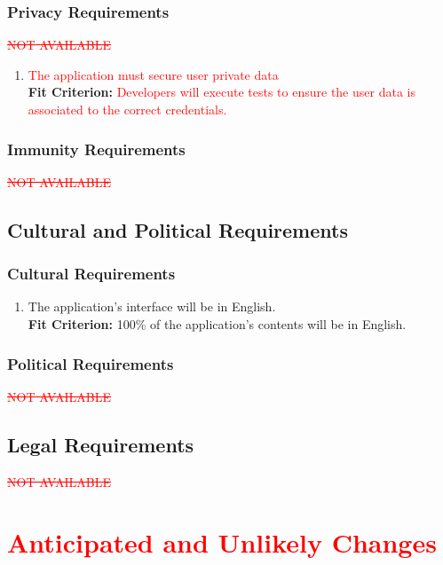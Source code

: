 \documentclass[12pt,letterpaper]{article}
\begin{document}
\subsubsection{Privacy Requirements}
\textcolor{red}{\sout{NOT AVAILABLE}}
\begin{enumerate}[{PR}1.] 
	\item {\textcolor{red}{The application must secure user private data}} \\
	{\textbf{Fit Criterion:} {\textcolor{red}{Developers will execute tests to ensure the user data is associated to the correct credentials.}}}
\end{enumerate}
\subsubsection{Immunity Requirements}
\textcolor{red}{\sout{NOT AVAILABLE}}
\subsection{Cultural and Political Requirements}
\subsubsection{Cultural Requirements}
\begin{enumerate}[{CU}1] 
	\item The application's interface will be in English. \\
	{\textbf{Fit Criterion:} 100\% of the application's contents will be in English. }
\end{enumerate}
\subsubsection{Political Requirements}
\textcolor{red}{\sout{NOT AVAILABLE}}
\subsection{Legal Requirements}
\textcolor{red}{\sout{NOT AVAILABLE}}


\section{\textcolor{red}{Anticipated and Unlikely Changes}}
\end{document}
